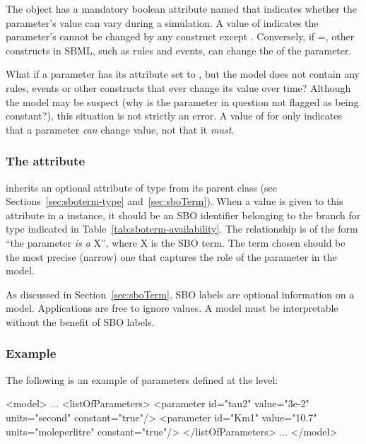 The \Parameter object has a mandatory boolean attribute named
 that indicates whether the parameter's value can
vary during a simulation.  A value of  indicates the
parameter's  cannot be changed by any construct
except \InitialAssignment.  Conversely, if
=, other constructs in SBML, such as
rules and events, can change the  of the parameter.

What if a parameter has its  attribute set to
, but the model does not contain any rules, events or
other constructs that ever change its value over time?  Although
the model may be suspect (why is the parameter in question not
flagged as being constant?), this situation is not strictly an
error.  A value of  for  only indicates
that a parameter \emph{can} change value, not that it \emph{must}.


\subsubsection{The  attribute}
\label{sec:parameter-sboterm}

\Parameter inherits an optional 
attribute of type  from its parent
class \SBase (see Sections~\ref{sec:sboterm-type}
and~\ref{sec:sboTerm}).  When a value is given to this
attribute in a \Parameter instance, it should be an
SBO identifier belonging to the branch for type \Parameter 
indicated in Table~\ref{tab:sboterm-availability}.  The relationship is
of the form ``the parameter \emph{is a} X'', where X is
the SBO term.  The term chosen should be the most precise (narrow)
one that captures the role of the parameter in the model.

As discussed in Section~\ref{sec:sboTerm}, SBO labels are optional
information on a model.  Applications are free to ignore
 values.  A model must be interpretable without the
benefit of SBO labels.


\subsubsection{Example}

The following is an example of parameters defined at the \Model level:

\begin{example}
<model>
    ...
    <listOfParameters>
        <parameter id="tau2" value="3e-2" units="second" constant="true"/>
        <parameter id="Km1" value="10.7" units="moleperlitre" constant="true"/>
    </listOfParameters>
    ...
</model>
\end{example}


